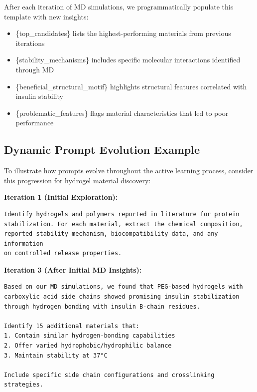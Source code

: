 \documentclass[11pt,a4paper]{article}
\begin{document}
After each iteration of MD simulations, we programmatically populate this template with new insights:

\begin{itemize}
    \item \{top\_candidates\} lists the highest-performing materials from previous iterations
    \item \{stability\_mechanisms\} includes specific molecular interactions identified through MD
    \item \{beneficial\_structural\_motif\} highlights structural features correlated with insulin stability
    \item \{problematic\_features\} flags material characteristics that led to poor performance
\end{itemize}

\subsection{Dynamic Prompt Evolution Example}

To illustrate how prompts evolve throughout the active learning process, consider this progression for hydrogel material discovery:

\textbf{Iteration 1 (Initial Exploration):}
\begin{lstlisting}
Identify hydrogels and polymers reported in literature for protein 
stabilization. For each material, extract the chemical composition, 
reported stability mechanism, biocompatibility data, and any information 
on controlled release properties.
\end{lstlisting}

\textbf{Iteration 3 (After Initial MD Insights):}
\begin{lstlisting}
Based on our MD simulations, we found that PEG-based hydrogels with 
carboxylic acid side chains showed promising insulin stabilization 
through hydrogen bonding with insulin B-chain residues. 

Identify 15 additional materials that:
1. Contain similar hydrogen-bonding capabilities
2. Offer varied hydrophobic/hydrophilic balance
3. Maintain stability at 37°C

Include specific side chain configurations and crosslinking strategies.
\end{lstlisting}
\end{document}

